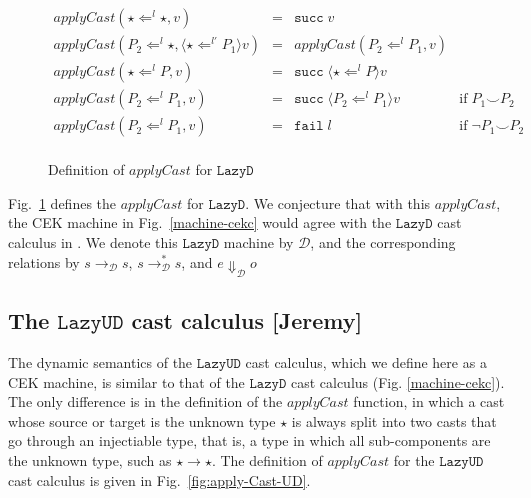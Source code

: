 \documentclass[acmsmall,review,anonymous]{acmart}\settopmatter{printfolios=true,printccs=false,printacmref=false}
\newcommand{\figref}[1]{Fig.~\ref{#1}}
\newcommand{\funrule}[3]{#1 &=& #2 & #3\\}
\newcommand{\lazyUD}{$\mathtt{Lazy UD}$}
\newcommand{\lazyD}{$\mathtt{Lazy D}$}
\newcommand{\cOOcast}[3]{#3 \Leftarrow^{#2} #1}
\newcommand{\vOOcast}[2]{\langle#2\rangle#1}
\newcommand{\rOOsucc}[1]{\mathtt{succ}\;#1}
\newcommand{\rOOfail}[1]{\mathtt{fail}\;#1}
\newcommand{\sidecond}[1]{\text{if}\;#1}
\newcommand{\ineffCEKD}{$ \mathcal{D} $}
\newcommand{\judgeDreduce}[2]{#1 \longrightarrow_{\mathcal{D}} #2}
\newcommand{\judgeDreduceTrans}[2]{#1 \longrightarrow_{\mathcal{D}}^{*} #2}
\newcommand{\judgeDeval}[2]{#1 \Downarrow_{\mathcal{D}} #2}
\begin{document}
\begin{figure}
	
	\[
	\begin{array}{rclr}
	\funrule{
		applyCast(\cOOcast{\star}{l}{\star},v)
	}{
		\rOOsucc{v}
	}{}
	\funrule{
		applyCast(\cOOcast{\star}{l}{P_2},\vOOcast{v}{\cOOcast{P_1}{l'}{\star}})
	}{
		applyCast(\cOOcast{P_1}{l}{P_2},v)
	}{}
	\funrule{
		applyCast(\cOOcast{P}{l}{\star},v)
	}{
		\rOOsucc{\vOOcast{v}{\cOOcast{P}{l}{\star}}}
	}{}
	\funrule{
		applyCast(\cOOcast{P_1}{l}{P_2},v)
	}{
		\rOOsucc{\vOOcast{v}{\cOOcast{P_1}{l}{P_2}}}
	}{\sidecond{P_1 \smile P_2}}
	\funrule{
		applyCast(\cOOcast{P_1}{l}{P_2},v)
	}{
		\rOOfail{l}
	}{\sidecond{\neg P_1 \smile P_2}}
	
	\end{array}
	\]
	\caption{Definition of $ applyCast $ for \lazyD}
	\label{fig:applyCast-D-C}
\end{figure}

\figref{fig:applyCast-D-C} defines the $ applyCast $ for \lazyD. 
We conjecture that with this $ applyCast $, the CEK machine in 
\figref{machine-cekc} would agree with the \lazyD{} cast calculus in 
\citet{siek2009exploring}. We denote this \lazyD{} machine by \ineffCEKD{},
and the corresponding relations by $ \judgeDreduce{s}{s} $, $ 
\judgeDreduceTrans{s}{s} $, and $ \judgeDeval{e}{o} $

\subsection{The \lazyUD{} cast calculus [Jeremy]}

The dynamic semantics of the \lazyUD{} cast calculus, which we define here as a
CEK machine, is similar to that of the \lazyD{} cast calculus
(Fig. \ref{machine-cekc}). The only difference is in the definition of
the $\mathit{applyCast}$ function, in which a cast whose source or
target is the unknown type $\star$ is always split into two casts that
go through an injectiable type, that is, a type in which all
sub-components are the unknown type, such as $\star \to \star$. The
definition of $\mathit{applyCast}$ for the \lazyUD{} cast calculus is given in
Fig.~\ref{fig:apply-Cast-UD}.
\end{document}
